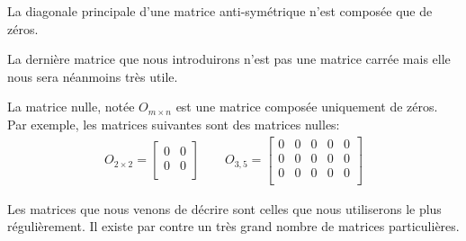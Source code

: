 \documentclass[]{book}
\theoremstyle{definition}
\theoremstyle{definition}
\theoremstyle{definition}
\theoremstyle{remark}
\let\BeginKnitrBlock\begin \let\EndKnitrBlock\end
\begin{document}

\BeginKnitrBlock{remark}
{}La diagonale principale d'une matrice anti-symétrique n'est composée que de zéros.
\EndKnitrBlock{remark}

La dernière matrice que nous introduirons n'est pas une matrice carrée mais elle nous sera néanmoins très utile.

\BeginKnitrBlock{definition}[La matrice nulle]
\protect\hypertarget{def:unnamed-chunk-48}{}{\label{def:unnamed-chunk-48} {} }La matrice nulle, notée \(O_{m\times n}\) est une matrice composée uniquement de zéros. Par exemple, les matrices suivantes sont des matrices nulles:
\begin{align*}
O_{2\times 2} = \begin{bmatrix}
0&0\\
0&0\\
\end{bmatrix}
\qquad 
O_{3,5} = \begin{bmatrix}
0&0&0&0&0\\
0&0&0&0&0\\
0&0&0&0&0\\
\end{bmatrix}
\end{align*}
\EndKnitrBlock{definition}

Les matrices que nous venons de décrire sont celles que nous utiliserons le plus régulièrement. Il existe par contre un très grand nombre de matrices particulières.
\end{document}
